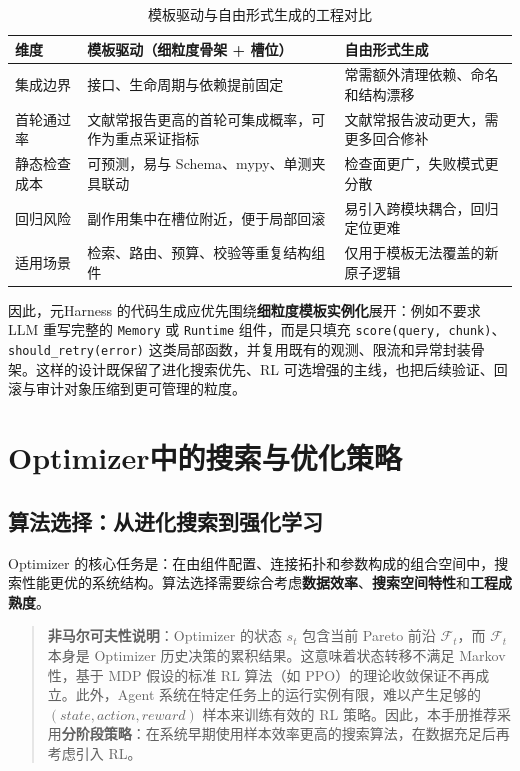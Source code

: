 \begin{table}[htbp]
\centering
\caption{模板驱动与自由形式生成的工程对比}
\label{tab:template-vs-freeform}
\begin{tabular}{@{}p{3cm}p{4cm}p{4cm}@{}}
\toprule
\textbf{维度} & \textbf{模板驱动（细粒度骨架 + 槽位）} & \textbf{自由形式生成} \\
\midrule
集成边界 & 接口、生命周期与依赖提前固定 & 常需额外清理依赖、命名和结构漂移 \\
首轮通过率 & 文献常报告更高的首轮可集成概率，可作为重点采证指标 & 文献常报告波动更大，需更多回合修补 \\
静态检查成本 & 可预测，易与 Schema、mypy、单测夹具联动 & 检查面更广，失败模式更分散 \\
回归风险 & 副作用集中在槽位附近，便于局部回滚 & 易引入跨模块耦合，回归定位更难 \\
适用场景 & 检索、路由、预算、校验等重复结构组件 & 仅用于模板无法覆盖的新原子逻辑 \\
\bottomrule
\end{tabular}
\end{table}

因此，元Harness 的代码生成应优先围绕\textbf{细粒度模板实例化}展开：例如不要求 LLM 重写完整的 \texttt{Memory} 或 \texttt{Runtime} 组件，而是只填充 \texttt{score(query, chunk)}、\texttt{should\_retry(error)} 这类局部函数，并复用既有的观测、限流和异常封装骨架。这样的设计既保留了进化搜索优先、RL 可选增强的主线，也把后续验证、回滚与审计对象压缩到更可管理的粒度。

\section{Optimizer中的搜索与优化策略}

\subsection{算法选择：从进化搜索到强化学习}

Optimizer 的核心任务是：在由组件配置、连接拓扑和参数构成的组合空间中，搜索性能更优的系统结构。算法选择需要综合考虑\textbf{数据效率}、\textbf{搜索空间特性}和\textbf{工程成熟度}。

\begin{quote}
\textbf{非马尔可夫性说明}：Optimizer 的状态 $s_t$ 包含当前 Pareto 前沿 $\mathcal{F}_t$，而 $\mathcal{F}_t$ 本身是 Optimizer 历史决策的累积结果。这意味着状态转移不满足 Markov 性，基于 MDP 假设的标准 RL 算法（如 PPO）的理论收敛保证不再成立。此外，Agent 系统在特定任务上的运行实例有限，难以产生足够的 $(state, action, reward)$ 样本来训练有效的 RL 策略。因此，本手册推荐采用\textbf{分阶段策略}：在系统早期使用样本效率更高的搜索算法，在数据充足后再考虑引入 RL。
\end{quote}

